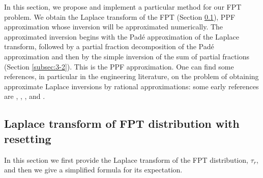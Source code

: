 \documentclass[preprint,12pt]{elsarticle}
\numberwithin{equation}{section}
\theoremstyle{plain} \newtheorem{theorem}{Theorem}[section]
\theoremstyle{plain} \newtheorem{proposition}[theorem]{Proposition}
\theoremstyle{plain} \newtheorem{lemma}[theorem]{Lemma}
\theoremstyle{plain} \newtheorem{corollary}[theorem]{Corollary}
\theoremstyle{definition} \newtheorem{definition}[theorem]{Definition}
\theoremstyle{definition} \newtheorem{notation}[theorem]{Notation}
\theoremstyle{remark} \newtheorem{remark}[theorem]{Remark}
\theoremstyle{remark} \newtheorem{remarks}[theorem]{Remarks}
\theoremstyle{remark} \newtheorem{algorithm2}[theorem]{Algorithm}
\theoremstyle{remark} \newtheorem{example}[theorem]{Example}
\begin{document}
In this section, we propose and implement a particular method for our FPT problem. We obtain the Laplace transform of the FPT 
(Section \ref{subsec:3-1}), PPF approximation whose inversion will be approximated numerically. The approximated inversion begins with the Pad\'e approximation of the Laplace transform, followed by a partial fraction decomposition of the Pad\'e approximation and then by the simple inversion of the sum of partial fractions (Section \ref{subsec:3-2}). 
This is the PPF
approximation. One can find
 some references, in particular in the engineering literature, on the problem of obtaining approximate Laplace inversions by rational approximations: some early references are \cite{Davies1979}, \cite{luke1961approximate}, \cite{ longman1973generation}, \cite{akin1969application} and \cite{luke196977ie}.

\subsection{Laplace transform of FPT distribution with resetting} \label{subsec:3-1}

In this section we first provide the Laplace transform of the FPT distribution, 
$\tau_r$, and then we give a simplified formula for its expectation. 
\end{document}

